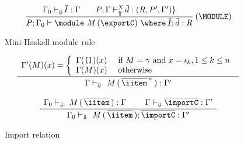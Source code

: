 \begin{figure}
\[ \begin{array}{cc}
	\displaystyle\frac
	 {\begin{array}{ll}
           \Gamma_0 \vdash_{\Downarrow} \overline{\!I} : \Gamma\:\: & \:\:P;\Gamma \vdash_{\Uparrow}^X \overline{\!d} : (R,P',\Gamma') \}
          \end{array}}
	 {P;\Gamma_0 \vdash \module\ M\, (\exportC)\ \where\ \overline{\!I};\, \overline{\!d} : R} \:(\MODULE)
\end{array} \]
\caption{Mini-Haskell module rule} 
\label{fig:mini-haskell-module-rule}
\end{figure}

\begin{figure}
\[ \begin{array}{cc}
	\displaystyle\frac
	 {\begin{array}{ll}
            \Gamma'(M)(x) = \left\{ \begin{array}{ll}
              \Gamma(\texttt{[]})(x) & \text{ if } M = \gamma \text{ and } x = \iota_k, %
                                                                           1 \leq k \leq n\\
               \Gamma(M)(x)          & \text{ otherwise}
             \end{array}\right.
          \end{array}}
	 {\Gamma \vdash_{\Downarrow} \ M\, (\,\overline{\iitem}^{\,n}\,) : \Gamma'} \\ \\

	\displaystyle\frac
	 {\begin{array}{ll}
	   \Gamma_0 \vdash_{\Downarrow} \ M\, (\,\overline{\iitem}\,) : \Gamma \:\:\: & \:\:\: 
           \Gamma \vdash_{\Downarrow} \overline{\importC} : \Gamma'
          \end{array}}
	 {\Gamma_0 \vdash_{\Downarrow} \ M\, (\,\overline{\iitem}\,); \overline{\importC} : \Gamma'} 
\end{array} \]
\caption{Import relation}
\label{fig:import-relation}
\end{figure}

